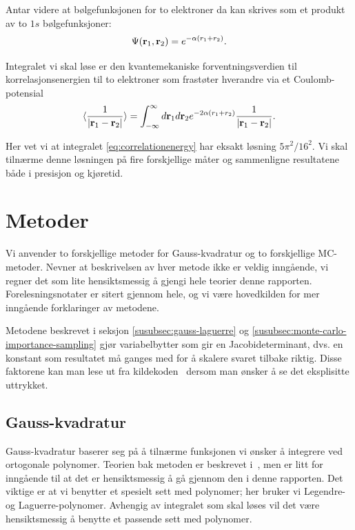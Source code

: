 \documentclass[11pt]{article}
\begin{document}
Antar videre at bølgefunksjonen for to elektroner da kan skrives som et produkt av
to $1s$ bølgefunksjoner:
\[
   \Psi({\bf r}_1,{\bf r}_2)  =   e^{-\alpha (r_1+r_2)}.
\]

Integralet vi skal løse er den kvantemekaniske forventningsverdien
til korrelasjonsenergien til to elektroner som frastøter hverandre via et Coulomb-potensial
\begin{equation}\label{eq:correlationenergy}
   \langle \frac{1}{|{\bf r}_1-{\bf r}_2|} \rangle =
   \int_{-\infty}^{\infty} d{\bf r}_1d{\bf r}_2  e^{-2\alpha (r_1+r_2)}\frac{1}{|{\bf r}_1-{\bf r}_2|}.
\end{equation}

Her vet vi at integralet \eqref{eq:correlationenergy} har eksakt løsning $5\pi^2/16^2$. Vi skal tilnærme denne 
løsningen på fire forskjellige måter og sammenligne resultatene både i presisjon og kjøretid.

\section{Metoder}
\label{sec:metoder}
Vi anvender to forskjellige metoder for Gauss-kvadratur og to
forskjellige MC-metoder. Nevner at beskrivelsen av hver metode ikke er
veldig inngående, vi regner det som lite hensiktsmessig å gjengi hele
teorier denne rapporten. Forelesningsnotater er sitert gjennom hele,
og vi være hovedkilden for mer inngående forklaringer av metodene.

Metodene beskrevet i seksjon \ref{susubsec:gauss-laguerre} og
\ref{susubsec:monte-carlo-importance-sampling} gjør variabelbytter som
gir en Jacobideterminant, dvs. en konstant som resultatet må ganges
med for å skalere svaret tilbake riktig. Disse faktorene kan man lese
ut fra kildekoden~\cite{github-repo} dersom man ønsker å se det
eksplisitte uttrykket.

\subsection{Gauss-kvadratur}
\label{subsec:gauss-kvadratur}
Gauss-kvadratur baserer seg på å tilnærme funksjonen vi ønsker å
integrere ved ortogonale polynomer. Teorien bak metoden er beskrevet
i~\cite{Lecture-notes}, men er litt for inngående til at det er
hensiktsmessig å gå gjennom den i denne rapporten. Det viktige er at
vi benytter et spesielt sett med polynomer; her bruker vi Legendre- og
Laguerre-polynomer. Avhengig av integralet som skal løses vil det være
hensiktsmessig å benytte et passende sett med polynomer.
\end{document}
